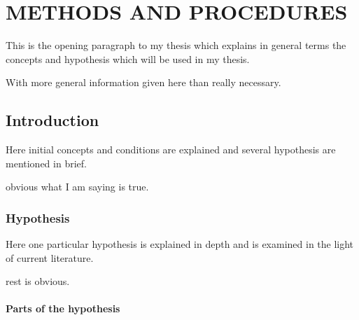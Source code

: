 \chapter{METHODS AND PROCEDURES}

This is the opening paragraph to my thesis which
explains in general terms the concepts and hypothesis
which will be used in my thesis.

With more general information given here than really
necessary.

\section{Introduction}

Here initial concepts and conditions are explained and
several hypothesis are mentioned in brief.

obvious what I am saying is true.




\subsection{Hypothesis}

Here one particular hypothesis is explained in depth
and is examined in the light of current literature.

rest is obvious.



\subsubsection{Parts of the hypothesis}

